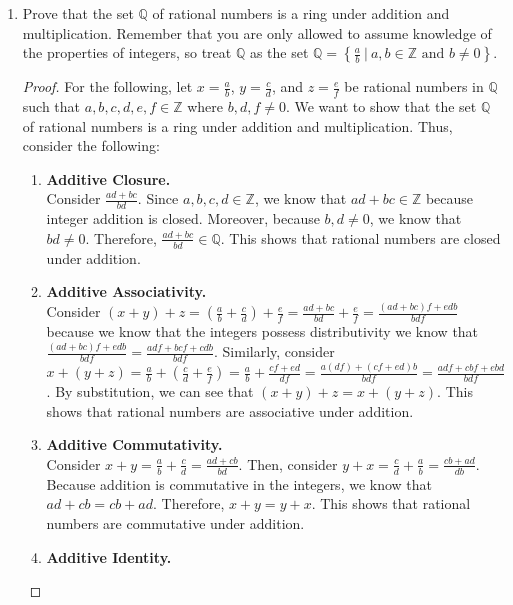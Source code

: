 \documentclass[11pt]{article}
\newcommand{\pf}[1]{
    \begin{customframedproof}
        \begin{proof}
        #1
        \end{proof}
    \end{customframedproof}
}
\newcommand{\points}[1]{\marginpar{[#1]}} %
\newcommand{\Z}{\mathbb{Z}}
\newcommand{\Q}{\mathbb{Q}}
\begin{document}
\begin{enumerate}
    \item Prove that the set \(\mathbb{Q}\) of rational numbers is a ring under addition and multiplication. Remember\points{10} that you are only allowed to assume knowledge of the properties of integers, so treat \(\mathbb{Q}\) as the set \(\displaystyle \mathbb{Q} = \left\{ \frac{a}{b} \ \Big| \ a,b \in \mathbb{Z} \text{ and } b \ne 0 \right\} \). \\
          \pf{
              For the following, let \(x = \frac{a}{b}\), \(y = \frac{c}{d}\), and \(z = \frac{e}{f}\) be rational numbers in \(\Q\) such that \(a,b,c,d,e,f \in \Z\) where \(b,d,f \ne 0\). We want to show that the set \(\mathbb{Q}\) of rational numbers is a ring under addition and multiplication. Thus, consider the following:
              \begin{enumerate}
                  \item \textbf{Additive Closure.} \\
                        Consider \(\frac{ad + bc}{bd}\). Since \(a,b,c,d \in \Z\), we know that \(ad + bc \in \Z\) because integer addition is closed. Moreover, because \(b,d \ne 0\), we know that \(bd \ne 0\). Therefore, \(\frac{ad + bc}{bd} \in \Q\). This shows that rational numbers are closed under addition.
                  \item \textbf{Additive Associativity.} \\
                        Consider \((x + y) + z = (\frac{a}{b} + \frac{c}{d}) + \frac{e}{f} = \frac{ad + bc}{bd} + \frac{e}{f} = \frac{(ad + bc)f + edb}{bdf}\) because we know that the integers possess distributivity we know that  \(\frac{(ad + bc)f + edb}{bdf} = \frac{adf + bcf + cdb}{bdf}\). Similarly, consider \(x + (y + z) = \frac{a}{b} + (\frac{c}{d} + \frac{e}{f}) = \frac{a}{b} + \frac{cf + ed}{df} = \frac{a(df) + (cf + ed)b}{bdf} = \frac{adf + cbf + ebd}{bdf}\). By substitution, we can see that \((x + y) + z = x + (y + z)\). This shows that rational numbers are associative under addition.
                  \item \textbf{Additive Commutativity.} \\
                        Consider \(x + y = \frac{a}{b} + \frac{c}{d} = \frac{ad + cb}{bd}\). Then, consider \(y + x = \frac{c}{d} + \frac{a}{b} = \frac{cb + ad}{db}\). Because addition is commutative in the integers, we know that \(ad + cb = cb + ad\). Therefore, \(x + y = y + x\). This shows that rational numbers are commutative under addition.
                  \item \textbf{Additive Identity.} \\

\end{enumerate}}
\end{enumerate}
\end{document}
